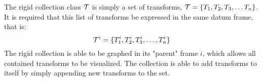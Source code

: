 The rigid collection class $\cal{T}$ is simply a set of transforms, ${\cal T} = \{T_1, T_2, T_3, \dots T_n\}$.
It is required that this list of transforms be expressed in the same datum frame, that is:
\begin{equation}
	{\cal T}^i = \{T_1^i, T_2^i, T_3^i, \dots, T_n^i\}
\end{equation}
The rigid collection is able to be graphed in its "parent" frame $i$, which allows all contained transforms to be visualized. 
The collection is able to add transforms to itself by simply appending new transforms to the set. 